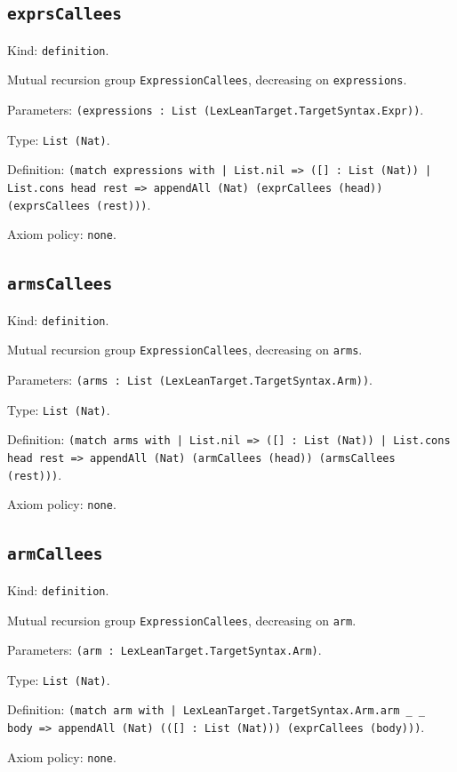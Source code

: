 \documentclass[11pt]{article}
\begin{document}
\subsection*{\texttt{exprsCallees}}
\noindent Kind: \texttt{definition}.\par
\noindent Mutual recursion group \texttt{ExpressionCallees}, decreasing on \texttt{expressions}.\par
\noindent Parameters: \texttt{(expressions : List (LexLeanTarget.TargetSyntax.Expr))}.\par
\noindent Type: \texttt{List (Nat)}.\par
\noindent Definition: \texttt{(match expressions with | List.nil => ([] : List (Nat)) | List.cons head rest => appendAll (Nat) (exprCallees (head)) (exprsCallees (rest)))}.\par
\noindent Axiom policy: \texttt{none}.\par
\subsection*{\texttt{armsCallees}}
\noindent Kind: \texttt{definition}.\par
\noindent Mutual recursion group \texttt{ExpressionCallees}, decreasing on \texttt{arms}.\par
\noindent Parameters: \texttt{(arms : List (LexLeanTarget.TargetSyntax.Arm))}.\par
\noindent Type: \texttt{List (Nat)}.\par
\noindent Definition: \texttt{(match arms with | List.nil => ([] : List (Nat)) | List.cons head rest => appendAll (Nat) (armCallees (head)) (armsCallees (rest)))}.\par
\noindent Axiom policy: \texttt{none}.\par
\subsection*{\texttt{armCallees}}
\noindent Kind: \texttt{definition}.\par
\noindent Mutual recursion group \texttt{ExpressionCallees}, decreasing on \texttt{arm}.\par
\noindent Parameters: \texttt{(arm : LexLeanTarget.TargetSyntax.Arm)}.\par
\noindent Type: \texttt{List (Nat)}.\par
\noindent Definition: \texttt{(match arm with | LexLeanTarget.TargetSyntax.Arm.arm \_ \_ body => appendAll (Nat) (([] : List (Nat))) (exprCallees (body)))}.\par
\noindent Axiom policy: \texttt{none}.\par
\end{document}
